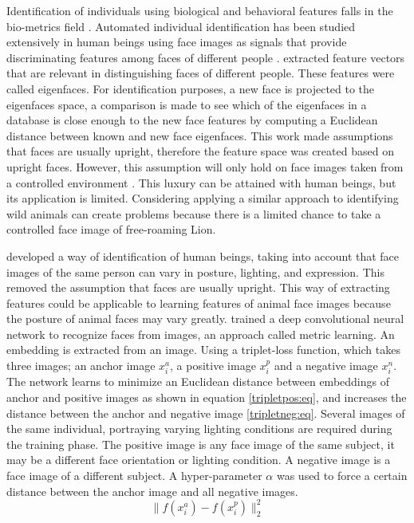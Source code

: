 Identification of individuals using biological and behavioral features falls in the bio-metrics field \cite{jain2004introduction}. Automated individual identification has been studied extensively in human beings using face images as signals that provide discriminating features among faces of different people \cite{turk1991face}. \citeauthor{turk1991face}  \citeyear{turk1991face} \cite{turk1991face} extracted feature vectors that are relevant in distinguishing faces of different people. These features were called eigenfaces. For identification purposes, a new face is projected to the eigenfaces space, a comparison is made to see which of the eigenfaces in a database is close enough to the new face features by computing a Euclidean distance between known and new face eigenfaces. This work made assumptions that faces are usually upright, therefore the feature space was created based on upright faces. However, this assumption will only hold on face images taken from a controlled environment \cite{huang2008labeled}. This luxury can be attained with human beings, but its application is limited. Considering applying a similar approach to identifying wild animals can create problems because there is a limited chance to take a controlled face image of free-roaming Lion.     

 \citeauthor{schroff2015facenet} \citeyear{schroff2015facenet} \cite{schroff2015facenet} developed a way of identification of human beings, taking into account that face images of the same person can vary in posture, lighting, and expression. This removed the assumption that faces are usually upright. This way of extracting features could be applicable to learning features of animal face images because the posture of animal faces may vary greatly. \citeauthor{schroff2015facenet} \citeyear{schroff2015facenet} \cite{schroff2015facenet} trained a deep convolutional neural network to recognize faces from images, an approach called metric learning. An embedding is extracted from an image. Using a triplet-loss function, which takes three images; an anchor image $x_{i}^a$, a positive image $x_{i}^p$ and a negative image $x_{i}^n$. The network learns to minimize an Euclidean distance between embeddings of anchor and positive images as shown in equation \ref{tripletpos:eq}, and increases the distance between the anchor and negative image \ref{tripletneg:eq}. Several images of the same individual, portraying varying lighting conditions are required during the training phase. The positive image is any face image of the same subject, it may be a different face orientation or lighting condition. A negative image is a face image of a different subject. A hyper-parameter $\alpha$ was used to force a certain distance between the anchor image and all negative images. 
 \begin{equation}\label{tripletpos:eq}
     \parallel f(x_{i}^a)-f(x_{i}^p)\parallel^2_2
 \end{equation}
 

